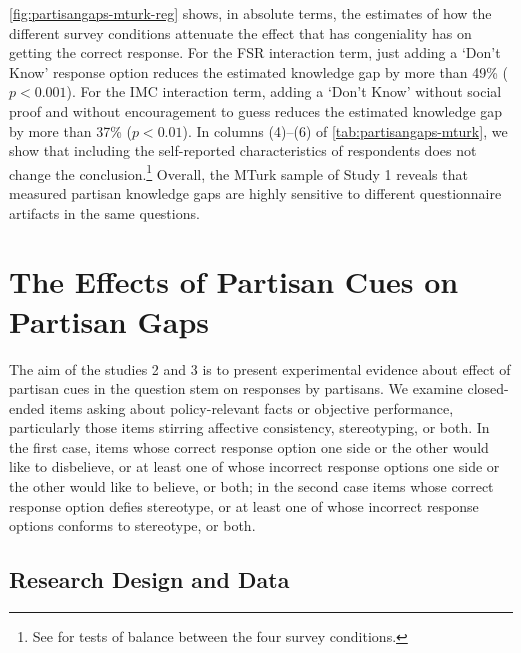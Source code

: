\documentclass[12pt, letterpaper]{article}
\begin{document}
	
	
	
	\cref{fig:partisangaps-mturk-reg} shows, in absolute terms, the estimates of how the different survey conditions attenuate the effect that has congeniality has on getting the correct response. For the FSR interaction term, just adding a `Don't Know' response option reduces the estimated knowledge gap by more than 49\% ($p<0.001$).
	For the IMC interaction term, adding a `Don't Know' without social proof and without encouragement to guess reduces the estimated knowledge gap by more than 37\% ($p<0.01$).
	In columns (4)--(6) of \cref{tab:partisangaps-mturk}, we show that including the self-reported characteristics of respondents does not change the conclusion.\footnote{See  for tests of balance between the four survey conditions.} Overall, the MTurk sample of Study 1 reveals that measured partisan knowledge gaps are highly sensitive to different questionnaire artifacts in the same questions.
	
	\newpage
	
	\section*{The Effects of Partisan Cues on Partisan Gaps}
	\label{sec:partisan_cues}
	The aim of the studies 2 and 3 is to present experimental evidence about effect of partisan cues in the question stem on responses by partisans. We examine closed-ended items asking about policy-relevant facts or objective performance, particularly those items stirring affective consistency, stereotyping, or both.  In the first case, items whose correct response option one side or the other would like to disbelieve, or at least one of whose incorrect response options one side or the other would like to believe, or both; in the second case items whose correct response option defies stereotype, or at least one of whose incorrect response options conforms to stereotype, or both.
	
	\subsection*{Research Design and Data}\label{sec:data2}
	
\end{document}
